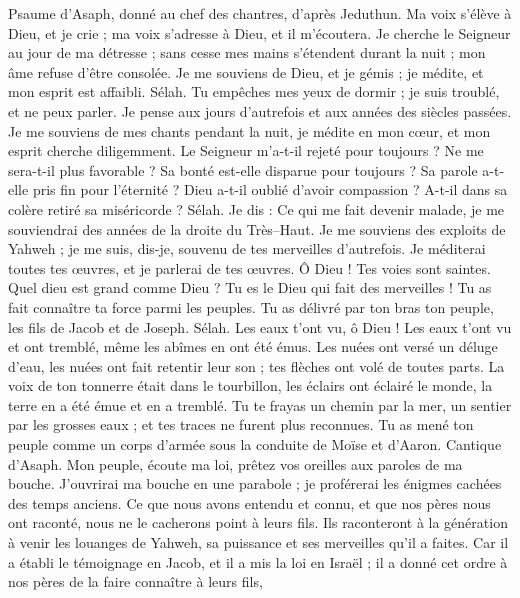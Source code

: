 \begin{multicols}{2}
\VerseOne{}Psaume d'Asaph, donné au chef des chantres, d'après Jeduthun.
Ma voix s'élève à Dieu, et je crie ; ma voix s'adresse à Dieu, et il m'écoutera.
Je cherche le Seigneur au jour de ma détresse ; sans cesse mes mains s'étendent durant la nuit ; mon âme refuse d'être consolée.
Je me souviens de Dieu, et je gémis ; je médite, et mon esprit est affaibli. Sélah.
Tu empêches mes yeux de dormir ; je suis troublé, et ne peux parler.
Je pense aux jours d'autrefois et aux années des siècles passées.
Je me souviens de mes chants pendant la nuit, je médite en mon cœur, et mon esprit cherche diligemment.
Le Seigneur m'a-t-il rejeté pour toujours ? Ne me sera-t-il plus favorable ?
Sa bonté est-elle disparue pour toujours ? Sa parole a-t-elle pris fin pour l'éternité ?
Dieu a-t-il oublié d'avoir compassion ? A-t-il dans sa colère retiré sa miséricorde ? Sélah.
Je dis : Ce qui me fait devenir malade, je me souviendrai des années de la droite du Très–Haut.
Je me souviens des exploits de Yahweh ; je me suis, dis-je, souvenu de tes merveilles d'autrefois.
Je méditerai toutes tes œuvres, et je parlerai de tes œuvres.
Ô Dieu ! Tes voies sont saintes. Quel dieu est grand comme Dieu ?
Tu es le Dieu qui fait des merveilles ! Tu as fait connaître ta force parmi les peuples.
Tu as délivré par ton bras ton peuple, les fils de Jacob et de Joseph. Sélah.
Les eaux t'ont vu, ô Dieu ! Les eaux t'ont vu et ont tremblé, même les abîmes en ont été émus.
Les nuées ont versé un déluge d'eau, les nuées ont fait retentir leur son ; tes flèches ont volé de toutes parts.
La voix de ton tonnerre était dans le tourbillon, les éclairs ont éclairé le monde, la terre en a été émue et en a tremblé.
Tu te frayas un chemin par la mer, un sentier par les grosses eaux ; et tes traces ne furent plus reconnues.
Tu as mené ton peuple comme un corps d'armée sous la conduite de Moïse et d'Aaron.
\VerseOne{}Cantique d'Asaph. Mon peuple, écoute ma loi, prêtez vos oreilles aux paroles de ma bouche.
J'ouvrirai ma bouche en une parabole ; je proférerai les énigmes cachées des temps anciens.
Ce que nous avons entendu et connu, et que nos pères nous ont raconté,
nous ne le cacherons point à leurs fils. Ils raconteront à la génération à venir les louanges de Yahweh, sa puissance et ses merveilles qu'il a faites.
Car il a établi le témoignage en Jacob, et il a mis la loi en Israël ; il a donné cet ordre à nos pères de la faire connaître à leurs fils,

\end{multicols}

